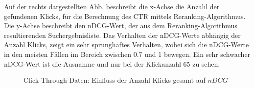 \begin{minipage}{0.40\linewidth}
Auf der rechts dargestellten Abb. beschreibt die x-Achse die Anzahl der gefundenen Klicks, für die Berechnung des CTR mittels Reranking-Algorithmus. Die y-Achse beschreibt den nDCG-Wert, der aus dem Reranking-Algorithmus resultierenden Suchergebnisliste. Das Verhalten der nDCG-Werte abhängig der Anzahl Klicks, zeigt ein sehr sprunghaftes Verhalten, wobei sich die nDCG-Werte in den meisten Fällen im Bereich zwischen 0.7 und 1 bewegen. Ein sehr schwacher nDCG-Wert ist die Ausnahme und nur bei der Klickanzahl 65 zu sehen.
\end{minipage}
\hfill
\begin{minipage}{0.55\linewidth}
\begin{figure}[H]
\centering 
\vspace{-1.5em}
\caption[Click-Through-Daten: Einfluss der Anzahl Klicks gesamt auf $nDCG$]{Click-Through-Daten: Einfluss der Anzahl Klicks gesamt auf $nDCG$}
\label{fig:Evaluation:Auswertung:ClicksNDCG}

\footnotesize
{}\clicks
\pgfsetplotmarksize{.5pt}
  

\vspace{-2.5em}
\end{figure}
\end{minipage}


